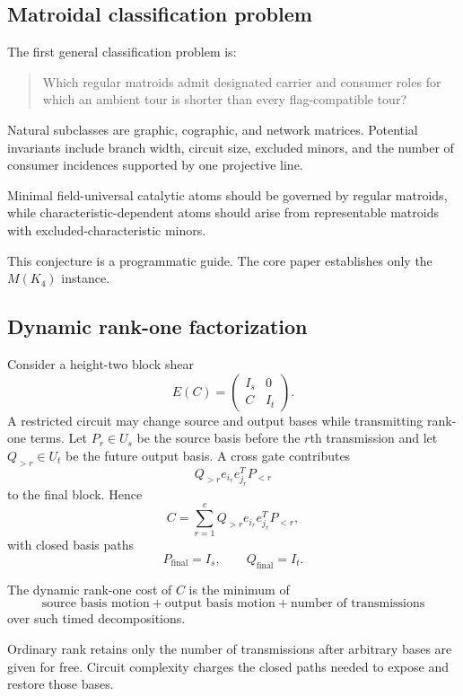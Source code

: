 \subsection{Matroidal classification problem}
The first general classification problem is:
\begin{quote}
Which regular matroids admit designated carrier and consumer roles for which an ambient tour is shorter than every flag-compatible tour?
\end{quote}
Natural subclasses are graphic, cographic, and network matrices.  Potential invariants include branch width, circuit size, excluded minors, and the number of consumer incidences supported by one projective line.

\begin{conjecturebox}
Minimal field-universal catalytic atoms should be governed by regular matroids, while characteristic-dependent atoms should arise from representable matroids with excluded-characteristic minors.
\end{conjecturebox}
This conjecture is a programmatic guide.  The core paper establishes only the $M(K_4)$ instance.

\subsection{Dynamic rank-one factorization}
Consider a height-two block shear
\[
E(C)=
\begin{pmatrix}
I_s&0\\
C&I_t
\end{pmatrix}.
\]
A restricted circuit may change source and output bases while transmitting rank-one terms.  Let $P_r\in U_s$ be the source basis before the $r$th transmission and let $Q_{>r}\in U_t$ be the future output basis.  A cross gate contributes
\[
Q_{>r}e_{i_r}e_{j_r}^{T}P_{<r}
\]
to the final block.  Hence
\[
C=
\sum_{r=1}^{c}
Q_{>r}e_{i_r}e_{j_r}^{T}P_{<r},
\]
with closed basis paths
\[
P_{\mathrm{final}}=I_s,
\qquad
Q_{\mathrm{final}}=I_t.
\]

\begin{definition}
The dynamic rank-one cost of $C$ is the minimum of
\[
\text{source basis motion}
+
\text{output basis motion}
+
\text{number of transmissions}
\]
over such timed decompositions.
\end{definition}
Ordinary rank retains only the number of transmissions after arbitrary bases are given for free.  Circuit complexity charges the closed paths needed to expose and restore those bases.

